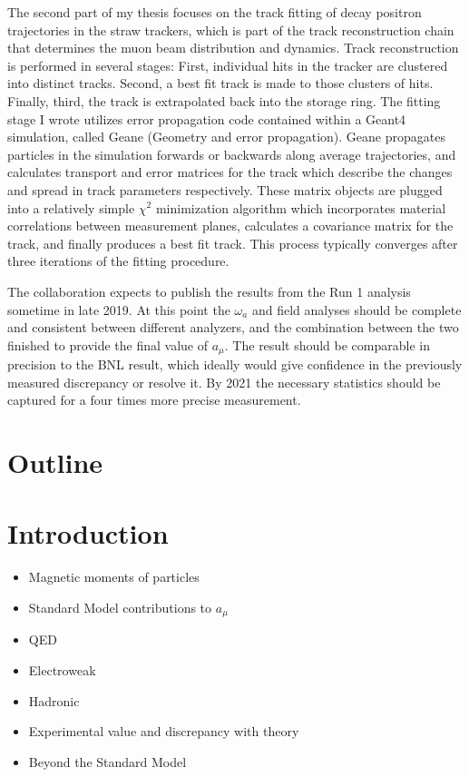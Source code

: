 \documentclass[12pt,letterpaper]{article}
\def\wa{$\omega_{a}$\xspace}
\def\chisq{$\chi^{2}$\xspace}
\def\amu{$a_{\mu}$\xspace}
\begin{document}
The second part of my thesis focuses on the track fitting of decay positron trajectories in the straw trackers, which is part of the track reconstruction chain that determines the muon beam distribution and dynamics. Track reconstruction is performed in several stages: First, individual hits in the tracker are clustered into distinct tracks. Second, a best fit track is made to those clusters of hits. Finally, third, the track is extrapolated back into the storage ring. The fitting stage I wrote utilizes error propagation code contained within a Geant4 simulation, called Geane (Geometry and error propagation). Geane propagates particles in the simulation forwards or backwards along average trajectories, and calculates transport and error matrices for the track which describe the changes and spread in track parameters respectively. These matrix objects are plugged into a relatively simple \chisq minimization algorithm which incorporates material correlations between measurement planes, calculates a covariance matrix for the track, and finally produces a best fit track. This process typically converges after three iterations of the fitting procedure.


The collaboration expects to publish the results from the Run 1 analysis sometime in late 2019. At this point the \wa and field analyses should be complete and consistent between different analyzers, and the combination between the two finished to provide the final value of \amu. The result should be comparable in precision to the BNL result, which ideally would give confidence in the previously measured discrepancy or resolve it. By 2021 the necessary statistics should be captured for a four times more precise measurement.



\section*{Outline}

\section{Introduction}

\begin{itemize}
	\item{Magnetic moments of particles}
	\item{Standard Model contributions to $a_{\mu}$}
	\item{QED}
	\item{Electroweak}
	\item{Hadronic}
	\item{Experimental value and discrepancy with theory}
	\item{Beyond the Standard Model}
\end{itemize}
\end{document}
